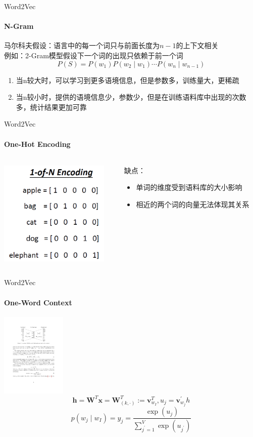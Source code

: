 \documentclass{beamer}
\begin{document}
\begin{frame}{Word2Vec}
    \framesubtitle{N-Gram}
    马尔科夫假设：语言中的每一个词只与前面长度为$n-1$的上下文相关 \\
    例如：2-Gram模型假设下一个词的出现只依赖于前一个词
    $$P(S)=P(w_1)P(w_2 \mid w_1) \cdots P(w_n\mid w_{n-1})$$
    \begin{enumerate}[1)]
        \item 当n较大时，可以学习到更多语境信息，但是参数多，训练量大，更稀疏
        \item 当n较小时，提供的语境信息少，参数少，但是在训练语料库中出现的次数多，统计结果更加可靠
    \end{enumerate}
\end{frame}
\begin{frame}{Word2Vec}
    \framesubtitle{One-Hot Encoding}
    \begin{columns}
        \begin{column}{0.5\textwidth}
            \centering\includegraphics[height=5cm]{one_hot.png}
        \end{column}
        \begin{column}{0.5\textwidth}
            缺点：
            \begin{itemize}
                \item 单词的维度受到语料库的大小影响
                \item 相近的两个词的向量无法体现其关系
            \end{itemize}
        \end{column}
    \end{columns}
\end{frame}
\begin{frame}{Word2Vec}
    \framesubtitle{One-Word Context}
    \centering\includegraphics[height=4cm]{word2vec_1.pdf}
    $$
        \mathbf{h}=\mathbf{W}^{T} \mathbf{x}=\mathbf{W}_{(k, \cdot)}^{T}:=\mathbf{v}_{w_{I}}^{T}, u_j=\mathbf{v}_{w_j}^{\prime}h
    $$
    $$
        p\left(w_{j} \mid w_{I}\right)=y_{j}=\frac{\exp \left(u_{j}\right)}{\sum_{j^{\prime}=1}^{V} \exp \left(u_{j^{\prime}}\right)}
        $$
\end{frame}
\end{document}
